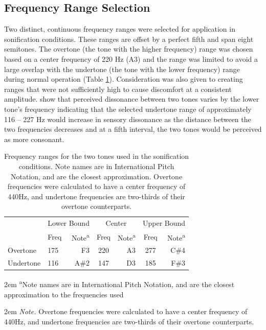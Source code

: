 \documentclass[10pt,a4paper,onecolumn]{article}
\begin{document}
\hypertarget{frequency-range-selection}{%
\subsection{Frequency Range Selection}\label{frequency-range-selection}}

Two distinct, continuous frequency ranges were selected for application in sonification conditions. These ranges are offset by a perfect fifth and span eight semitones. The overtone (the tone with the higher frequency) range was chosen based on a center frequency of 220 Hz (A3) and the range was limited to avoid a large overlap with the undertone (the tone with the lower frequency) range during normal operation (Table \ref{tab:frequency-ranges}). Consideration was also given to creating ranges that were not sufficiently high to cause discomfort at a consistent amplitude. \textcite{setharesSoundSound2005} show that perceived dissonance between two tones varies by the lower tone's frequency indicating that the selected undertone range of approximately 116 -- 227 Hz would increase in sensory dissonance as the distance between the two frequencies decreases and at a fifth interval, the two tones would be perceived as more consonant.

\begin{table}[!h]

\begin{threeparttable}
\caption{\label{tab:frequency-ranges}Frequency ranges for the two tones used in the sonification conditions. Note names are in International Pitch Notation, and are the closest approximation. Overtone frequencies were calculated to have a center frequency of 440Hz, and undertone frequencies are two-thirds of their overtone counterparts.}
\centering
\fontsize{7}{9}\selectfont
\begin{tabular}[t]{>{}l>{}l>{}r>{}c>{}r>{}c>{}r}
\toprule
\multicolumn{1}{c}{} & \multicolumn{2}{c}{Lower Bound} & \multicolumn{2}{c}{Center} & \multicolumn{2}{c}{Upper Bound} \\
\cmidrule(l{3pt}r{3pt}){2-3} \cmidrule(l{3pt}r{3pt}){4-5} \cmidrule(l{3pt}r{3pt}){6-7}
  & Freq & Note\textsuperscript{a} & Freq & Note\textsuperscript{a} & Freq & Note\textsuperscript{a}\\
\midrule
Overtone & 175 & F3 & 220 & A3 & 277 & C\#4\\
Undertone & 116 & A\#2 & 147 & D3 & 185 & F\#3\\
\bottomrule
\end{tabular}
\begin{tablenotes}
\small
\item [] 
\rightskip2em
{\footnotesize \sffamily \textsuperscript{a}Note names are in International Pitch Notation, and are the closest approximation to the frequencies used}
\item [] 
\rightskip2em
{\footnotesize \sffamily \textit{Note.} Overtone frequencies were calculated to have a center frequency of 440Hz, and undertone frequencies are two-thirds of their overtone counterparts.}
\end{tablenotes}
\end{threeparttable}
\end{table}
\end{document}
